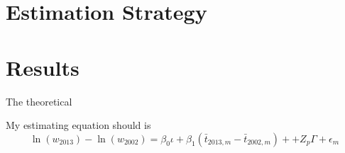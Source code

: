 \documentclass[12pt]{article}
\begin{document}
\vspace{-10pt}
\section{Estimation Strategy}
\label{sec:Model}



\vspace{-10pt}
\section{Results}
\label{sec:Results}


The theoretical 


My estimating equation should is 
\begin{equation}
\ln(w_{2013})- \ln(w_{2002}) = \beta_0 \iota + \beta_1( \bar{t}_{2013,m}-\bar{t}_{2002,m})+
+Z_p \Gamma + \epsilon_m
\end{equation}
\end{document}
